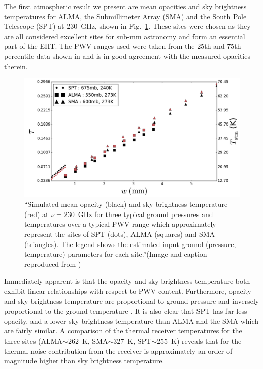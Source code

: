 The first atmospheric result we present are mean opacities and sky brightness temperatures for ALMA, the Submillimeter Array (SMA) and the South Pole Telescope (SPT) at 230~GHz, shown in Fig.~\ref{fig:mean_atm}. These sites were chosen as they are all considered excellent sites for sub-mm astronomy and form an essential part of the EHT. The PWV ranges used were taken from the 25th and 75th percentile data shown in \citet{Lane_1998} and is in good agreement with the measured opacities therein. %

\begin{figure}[h!]
\includegraphics[width=1.\columnwidth]{Images/opacity}
\caption{``Simulated mean opacity (black) and sky brightness temperature (red) at $\nu =230$~GHz  for three typical ground pressures and temperatures over a typical PWV range \citep{Lane_1998} which approximately represent the sites of SPT (dots), ALMA (squares) and SMA (triangles). The legend shows the estimated input ground (pressure, temperature) parameters for each site.''(Image and caption reproduced from \citet{Blecher_2016})\label{fig:mean_atm}%
}
\end{figure}

Immediately apparent is that the opacity and sky brightness temperature both exhibit linear relationships with respect to PWV content. Furthermore, opacity and sky brightness temperature are proportional to ground pressure and inversely proportional to the ground temperature \citep{Pardo_2001}. It is also clear that SPT has far less opacity, and a lower sky brightness temperature than ALMA and the SMA which are fairly similar. A comparison of the thermal receiver temperatures for the three sites  (ALMA$\sim262$~K,  SMA$\sim327$~K, SPT$\sim 255$~K) reveals that for the thermal noise contribution from the receiver is approximately an order of magnitude higher than sky brightness temperature. 



